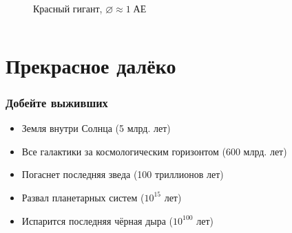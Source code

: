 \documentclass[aspectratio=169]{beamer}
\begin{document}
\begin{frame}
\begin{columns}[c]
{\begin{figure}
\captionsetup{labelformat=empty}
\caption{Красный гигант, $\varnothing \approx 1 \; \mathrm{\text{АЕ}}$}
\end{figure}
}
\end{columns}
\end{frame}

\section{Прекрасное далёко}
\begin{frame}
\frametitle{Добейте выживших}
\begin{itemize}
\item Земля внутри Солнца (5 млрд. лет)
\item Все галактики за космологическим горизонтом (600 млрд. лет)
\item Погаснет последняя зведа (100 триллионов лет)
\item Развал планетарных систем ($10^{15}$ лет)
\item Испарится последняя чёрная дыра ($10^{100}$ лет)
\end{itemize}
\end{frame}
\end{document}
